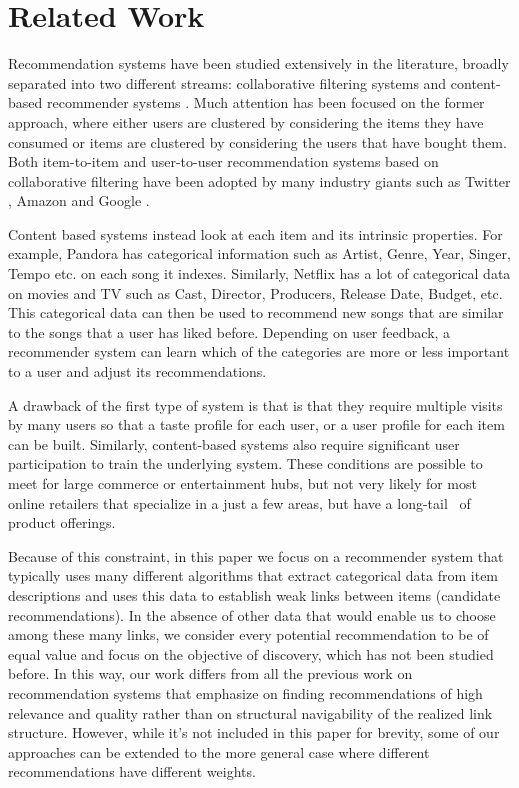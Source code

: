 \section{Related Work}

Recommendation systems have been studied extensively in the literature, %
broadly separated into two different streams: collaborative filtering systems and content-based recommender systems \cite{almazro2010survey}. Much attention has been focused on the former approach, where either users are clustered by considering the items they have consumed or items are clustered by considering the users that have bought them. Both item-to-item and user-to-user recommendation systems based on collaborative filtering have been adopted by many industry giants such as Twitter \cite{twitter-collab-filtering}, Amazon \cite{amazon-collab-filtering} and Google \cite{google-collab-filtering}.  \vs

Content based systems instead look at each item and its intrinsic properties. For example, Pandora has categorical information such as Artist, Genre, Year, Singer, Tempo etc. on each song it indexes. Similarly, Netflix has a lot of categorical data on movies and TV such as Cast, Director, Producers, Release Date, Budget, etc. This categorical data can then be used to recommend new songs that are similar to the songs that a user has liked before. Depending on user feedback, a recommender system can learn which of the categories are more or less important to a user and adjust its recommendations. \vs

A drawback of the first type of system is that is that they require multiple visits by many users so that a taste profile for each user, or a user profile for each item can be built.
Similarly, content-based systems also require significant user participation to train the underlying system. These conditions are possible to meet for large commerce or entertainment hubs,
but not very likely for most online retailers that specialize in a just a few areas, but have a long-tail~\cite{Anderson2006} of product offerings. \vs

Because of this constraint, in this paper we focus on a recommender system that typically uses many different algorithms that extract categorical data from item descriptions and uses this data to establish weak links between items (candidate recommendations). In the absence of other data that would enable us to choose among these many links, we consider every potential recommendation to be of equal value and focus on the objective of discovery, which has not been studied before. In this way, our work differs from all the previous work on recommendation systems that emphasize on finding recommendations of high relevance and quality rather than on structural navigability of the realized link structure. However, while it's not included in this paper for brevity, some of our approaches can be extended to the more general case where different recommendations have different weights. \vs

